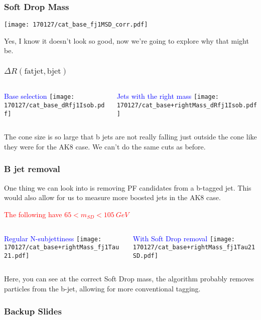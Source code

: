 \documentclass{beamer}
\newcommand{\beginbackup}{
  \newcounter{framenumbervorappendix}
  \setcounter{framenumbervorappendix}{\value{framenumber}}
}
\newcommand{\backupend}{
  \addtocounter{framenumbervorappendix}{-\value{framenumber}}
  \addtocounter{framenumber}{\value{framenumbervorappendix}}
}
\begin{document}
\begin{frame}
  \frametitle{Soft Drop Mass}

  \begin{center}
  \texttt{[image: 170127/cat\_base\_fj1MSD\_corr.pdf]}
  \end{center}

  Yes, I know it doesn't look so good, now we're going to explore why that might be.

\end{frame}

\begin{frame}
  \frametitle{$\Delta R\mathrm{(fat jet, b jet)}$}

  \begin{columns}
    \begin{column}{0.5\linewidth}
      \centering
      \textcolor{blue}{Base selection}
      \texttt{[image: 170127/cat\_base\_dRfj1Isob.pdf]}
    \end{column}
    \begin{column}{0.5\linewidth}
      \centering
      \textcolor{blue}{Jets with the right mass}
      \texttt{[image: 170127/cat\_base+rightMass\_dRfj1Isob.pdf]}
    \end{column}
  \end{columns}

  The cone size is so large that b jets are not really falling just outside the cone
  like they were for the AK8 case.
  We can't do the same cuts as before.

\end{frame}

\begin{frame}
  \frametitle{B jet removal}

  One thing we can look into is removing PF candidates from a b-tagged jet.
  This would also allow for us to measure more boosted jets in the AK8 case.

  \textcolor{red}{The following have $65 < m_{SD} < \SI{105}{GeV}$}

  \begin{columns}
    \begin{column}{0.5\linewidth}
      \centering
      \textcolor{blue}{Regular N-subjettiness}
      \texttt{[image: 170127/cat\_base+rightMass\_fj1Tau21.pdf]}
    \end{column}
    \begin{column}{0.5\linewidth}
      \centering
      \textcolor{blue}{With Soft Drop removal}
      \texttt{[image: 170127/cat\_base+rightMass\_fj1Tau21SD.pdf]}
    \end{column}
  \end{columns}

  Here, you can see at the correct Soft Drop mass, the algorithm probably removes particles from the b-jet, allowing for more conventional tagging.

\end{frame}


\beginbackup

\begin{frame}
  \frametitle{Backup Slides}
\end{frame}



\backupend
\end{document}
